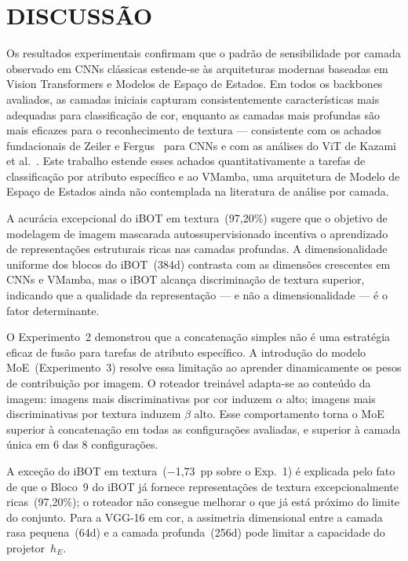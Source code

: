 \documentclass[letterpaper, 10 pt, conference]{ieeeconf}
\begin{document}
\section{DISCUSSÃO}

Os resultados experimentais confirmam que o padrão de sensibilidade por
camada observado em CNNs clássicas estende-se às arquiteturas modernas
baseadas em Vision Transformers e Modelos de Espaço de Estados.
Em todos os backbones avaliados, as camadas iniciais capturam
consistentemente características mais adequadas para classificação de cor,
enquanto as camadas mais profundas são mais eficazes para o reconhecimento
de textura — consistente com os achados fundacionais de Zeiler e
Fergus~\cite{bzeiler} para CNNs e com as análises do ViT de Kazami
et al.~\cite{bkazami}.
Este trabalho estende esses achados quantitativamente a tarefas de
classificação por atributo específico e ao VMamba, uma arquitetura de
Modelo de Espaço de Estados ainda não contemplada na literatura de análise
por camada.

A acurácia excepcional do iBOT em textura~(97,20\%) sugere que o objetivo
de modelagem de imagem mascarada autossupervisionado incentiva o aprendizado
de representações estruturais ricas nas camadas profundas.
A dimensionalidade uniforme dos blocos do iBOT~(384d) contrasta com as
dimensões crescentes em CNNs e VMamba, mas o iBOT alcança discriminação de
textura superior, indicando que a qualidade da representação — e não a
dimensionalidade — é o fator determinante.

O Experimento~2 demonstrou que a concatenação simples não é uma estratégia
eficaz de fusão para tarefas de atributo específico.
A introdução do modelo MoE~(Experimento~3) resolve essa limitação ao
aprender dinamicamente os pesos de contribuição por imagem.
O roteador treinável adapta-se ao conteúdo da imagem: imagens mais
discriminativas por cor induzem $\alpha$ alto; imagens mais discriminativas
por textura induzem $\beta$ alto.
Esse comportamento torna o MoE superior à concatenação em todas as
configurações avaliadas, e superior à camada única em 6 das 8
configurações.

A exceção do iBOT em textura~($-$1,73~pp sobre o Exp.~1) é explicada pelo
fato de que o Bloco~9 do iBOT já fornece representações de textura
excepcionalmente ricas~(97,20\%); o roteador não consegue melhorar o que já
está próximo do limite do conjunto.
Para a VGG-16 em cor, a assimetria dimensional entre a camada rasa
pequena~(64d) e a camada profunda~(256d) pode limitar a capacidade do
projetor~$h_E$.
\end{document}
